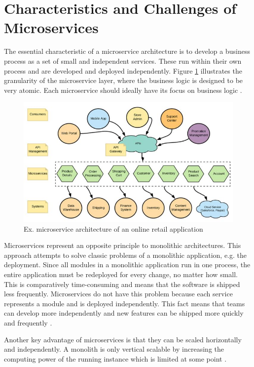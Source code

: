 \section{Characteristics and Challenges of Microservices}
\label{chap:microservices}
The essential characteristic of a microservice architecture is to develop a business process as a set of small and independent services. These run within their own process and are developed and deployed independently. Figure \ref{fig:microservice} illustrates the granularity of the microservice layer, where the business logic is designed to be very atomic. Each microservice should ideally have its focus on business logic \cite[p. 7]{sm3}.

\begin{figure}
    \includegraphics[width=\columnwidth]{img/microservice.JPG}
    \caption{Ex. microservice architecture of an online retail application \cite[p. 7]{sm3}}
    \label{fig:microservice}
\end{figure}

Microservices represent an opposite principle to monolithic architectures. This approach attempts to solve classic problems of a monolithic application, e.g. the deployment. Since all modules in a monolithic application run in one process, the entire application must be redeployed for every change, no matter how small. This is comparatively time-consuming and means that the software is shipped less frequently. Microservices do not have this problem because each service represents a module and is deployed independently. This fact means that teams can develop more independently and new features can be shipped more quickly and frequently \cite{fowler}.

Another key advantage of microservices is that they can be scaled horizontally and independently. A monolith is only vertical scalable by increasing the computing power of the running instance which is limited at some point \cite{fowler}.

